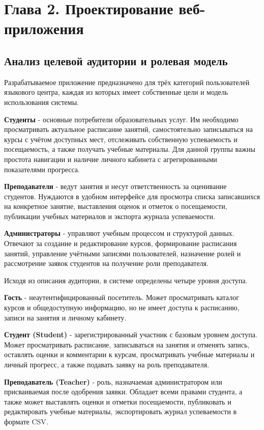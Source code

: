 \section*{Глава 2. Проектирование веб-приложения}

\subsection{Анализ целевой аудитории и ролевая модель}

Разрабатываемое приложение предназначено для трёх категорий пользователей языкового
центра, каждая из которых имеет собственные цели и модель использования системы.

\textbf{Студенты} - основные потребители образовательных услуг. Им необходимо
просматривать актуальное расписание занятий, самостоятельно записываться на курсы
с учётом доступных мест, отслеживать собственную успеваемость и посещаемость,
а также получать учебные материалы. Для данной группы важны простота навигации
и наличие личного кабинета с агрегированными показателями прогресса.

\textbf{Преподаватели} - ведут занятия и несут ответственность за оценивание
студентов. Нуждаются в удобном интерфейсе для просмотра списка записавшихся
на конкретное занятие, выставления оценок и отметок о посещаемости, публикации
учебных материалов и экспорта журнала успеваемости.

\textbf{Администраторы} - управляют учебным процессом и структурой данных.
Отвечают за создание и редактирование курсов, формирование расписания занятий,
управление учётными записями пользователей, назначение ролей и рассмотрение заявок
студентов на получение роли преподавателя.

Исходя из описания аудитории, в системе определены четыре уровня доступа.

\textbf{Гость} - неаутентифицированный посетитель. Может просматривать каталог
курсов и общедоступную информацию, но не имеет доступа к расписанию, записи
на занятия и личному кабинету.

\textbf{Студент (Student)} - зарегистрированный участник с базовым уровнем
доступа. Может просматривать расписание, записываться на занятия и отменять запись,
оставлять оценки и комментарии к курсам, просматривать учебные материалы и личный
прогресс, а также подавать заявку на роль преподавателя.

\textbf{Преподаватель (Teacher)} - роль, назначаемая администратором или
присваиваемая после одобрения заявки. Обладает всеми правами студента,
а также может выставлять оценки и отметки посещаемости, публиковать и редактировать
учебные материалы, экспортировать журнал успеваемости в формате CSV.

